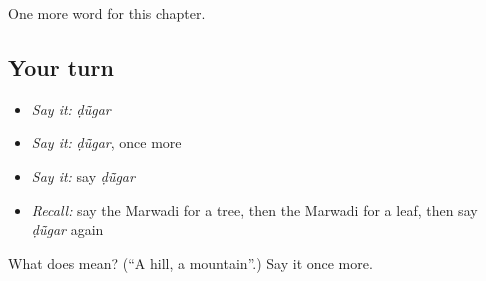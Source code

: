 \begin{grammarlens}[title={What you've built}]
One more word for this chapter.
\end{grammarlens}

\subsection*{Your turn}
\begin{itemize}
\raggedright
  \item \emph{Say it:} \emph{ḍū̃gar}
  \item \emph{Say it:} \emph{ḍū̃gar}, once more
  \item \emph{Say it:} say \emph{ḍū̃gar}
  \item \emph{Recall:} say the Marwadi for a tree, then the Marwadi for a leaf, then say \emph{ḍū̃gar} again
\end{itemize}

\begin{tcolorbox}[breakable,colback=teal!4,colframe=teal!35!black,title={Before you move on}]
What does  mean? (\textquotedblleft{}A hill, a mountain\textquotedblright{}.) Say it once more.
\end{tcolorbox}
